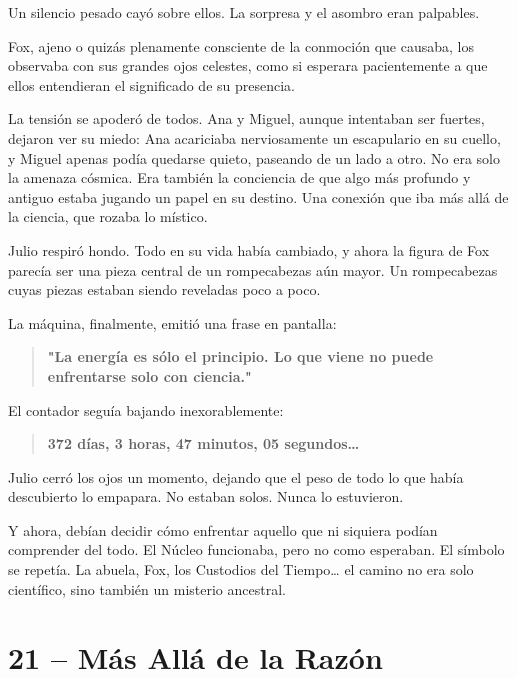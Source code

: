 \documentclass[a4paper,12pt]{book}
\begin{document}
Un silencio pesado cayó sobre ellos. La sorpresa y el asombro eran palpables.

Fox, ajeno o quizás plenamente consciente de la conmoción que causaba, los observaba con sus grandes ojos celestes, como si esperara pacientemente a que ellos entendieran el significado de su presencia.

La tensión se apoderó de todos. Ana y Miguel, aunque intentaban ser fuertes, dejaron ver su miedo: Ana acariciaba nerviosamente un escapulario en su cuello, y Miguel apenas podía quedarse quieto, paseando de un lado a otro. No era solo la amenaza cósmica. Era también la conciencia de que algo más profundo y antiguo estaba jugando un papel en su destino. Una conexión que iba más allá de la ciencia, que rozaba lo místico.

Julio respiró hondo. Todo en su vida había cambiado, y ahora la figura de Fox parecía ser una pieza central de un rompecabezas aún mayor. Un rompecabezas cuyas piezas estaban siendo reveladas poco a poco.

La máquina, finalmente, emitió una frase en pantalla:

\begin{quote}
    \textbf{"La energía es sólo el principio. Lo que viene no puede enfrentarse solo con ciencia."}
\end{quote}

El contador seguía bajando inexorablemente:

\begin{quote}
    \textbf{372 días, 3 horas, 47 minutos, 05 segundos…}
\end{quote}

Julio cerró los ojos un momento, dejando que el peso de todo lo que había descubierto lo empapara. No estaban solos. Nunca lo estuvieron.

Y ahora, debían decidir cómo enfrentar aquello que ni siquiera podían comprender del todo. El Núcleo funcionaba, pero no como esperaban. El símbolo se repetía. La abuela, Fox, los Custodios del Tiempo… el camino no era solo científico, sino también un misterio ancestral.

\cleardoublepage %

\chapter*{21 – Más Allá de la Razón}
\end{document}
